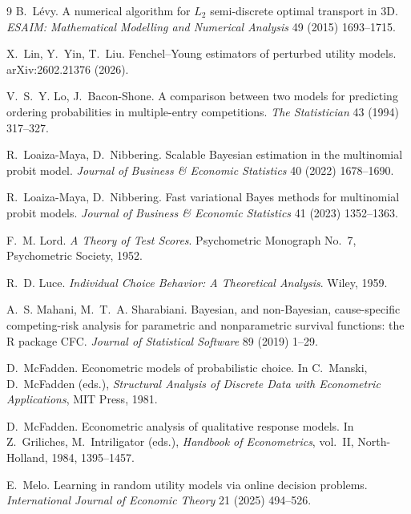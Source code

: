 \documentclass[12pt]{article}
\theoremstyle{remark}
\begin{document}
\begin{thebibliography}{9}
 B.~L\'evy. A numerical algorithm for
$L_2$ semi-discrete optimal transport in 3D. \emph{ESAIM: Mathematical
Modelling and Numerical Analysis} 49 (2015) 1693--1715.

 X.~Lin,
Y.~Yin, T.~Liu. Fenchel--Young estimators of perturbed utility
models. arXiv:2602.21376 (2026).

 V.~S.~Y. Lo, J.~Bacon-Shone.
A comparison between two models for predicting ordering probabilities in
multiple-entry competitions. \emph{The Statistician} 43 (1994) 317--327.

 R.~Loaiza-Maya, D.~Nibbering. Scalable Bayesian
estimation in the multinomial probit model. \emph{Journal of Business \&
Economic Statistics} 40 (2022) 1678--1690.

 R.~Loaiza-Maya,
D.~Nibbering. Fast variational Bayes methods for multinomial probit
models. \emph{Journal of Business \& Economic Statistics} 41 (2023)
1352--1363.

 F.~M. Lord. \emph{A Theory of Test
Scores}. Psychometric Monograph No.~7, Psychometric Society, 1952.

 R.~D. Luce. \emph{Individual Choice
Behavior: A Theoretical Analysis}. Wiley, 1959.

 A.~S. Mahani,
M.~T.~A. Sharabiani. Bayesian, and non-Bayesian, cause-specific
competing-risk analysis for parametric and nonparametric survival
functions: the R package CFC. \emph{Journal of Statistical Software} 89
(2019) 1--29.

 D.~McFadden. Econometric models of probabilistic
choice. In C.~Manski, D.~McFadden (eds.), \emph{Structural Analysis of
Discrete Data with Econometric Applications}, MIT Press, 1981.

 D.~McFadden. Econometric
analysis of qualitative response models. In Z.~Griliches,
M.~Intriligator (eds.), \emph{Handbook of Econometrics}, vol.~II,
North-Holland, 1984, 1395--1457.

 E.~Melo. Learning in random utility
models via online decision problems. \emph{International Journal of
Economic Theory} 21 (2025) 494--526.


\end{thebibliography}
\end{document}

